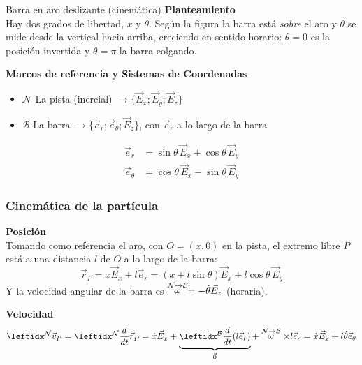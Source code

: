 \begin{solucion}{Barra en aro deslizante (cinemática)}
\textbf{Planteamiento}\\
Hay dos grados de libertad, $x$ y $\theta$. Según la figura la barra está \emph{sobre} el aro y $\theta$ se mide desde la vertical hacia arriba, creciendo en sentido horario: $\theta=0$ es la posición invertida y $\theta=\pi$ la barra colgando.


\textbf{Marcos de referencia y Sistemas de Coordenadas}
\begin{itemize}
    \item $\mathcal{N}$ La pista (inercial) $\longrightarrow\{\vec{E}_x;\vec{E}_y;\vec{E}_z\}$
    \item $\mathcal{B}$ La barra $\longrightarrow\{\vec{e}_r;\vec{e}_\theta;\vec{E}_z\}$, con $\vec{e}_r$ a lo largo de la barra
\end{itemize}
\begin{equation*}
\begin{split}
    \vec{e}_r&=\sin\theta\,\vec{E}_x+\cos\theta\,\vec{E}_y\\
    \vec{e}_\theta&=\cos\theta\,\vec{E}_x-\sin\theta\,\vec{E}_y
\end{split}
\end{equation*}

\subsubsection*{Cinemática de la partícula}
\textbf{Posición}\\
Tomando como referencia el aro, con $O=(x,0)$ en la pista, el extremo libre $P$ está a una distancia $l$ de $O$ a lo largo de la barra:
$$\vec{r}_P=x\vec{E}_x+l\vec{e}_r=\left(x+l\sin\theta\right)\vec{E}_x+l\cos\theta\,\vec{E}_y$$
Y la velocidad angular de la barra es $\stackrel{\mathcal{N} \to \mathcal{B}}{\omega}=-\dot\theta\vec{E}_z$ (horaria).

\textbf{Velocidad}\\
$$\marc{\vec{v}_P}{N}=\der{\vec{r}_P}{N}=\dot{x}\vec{E}_x+\underbrace{\der{(l\vec{e}_r)}{B}{}}_{\vec{0}}+\velang{N}{B}\times l\vec{e}_r=\dot{x}\vec{E}_x+l\dot\theta\vec{e}_\theta$$


\end{solucion}
